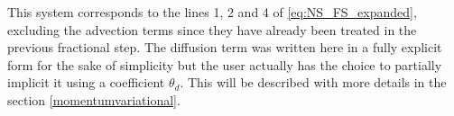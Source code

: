 \begin{enumerate}
This system corresponds to the lines 1, 2 and 4 of \eqref{eq:NS_FS_expanded}, excluding the advection terms
since they have already been treated in the previous fractional step.
The diffusion term was written here in a fully explicit form for the sake of simplicity but
the user actually has the choice to partially implicit it using a coefficient $\theta_d$.
This will be described with more details in the section \ref{momentumvariational}.\\


\end{enumerate}
